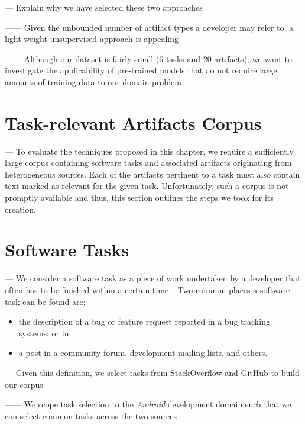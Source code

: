 \clearpage

--- Explain why we have selected these two approaches

------ Given the unbounded number of artifact types a developer may refer to, a light-weight unsupervised approach is appealing

------ Although our dataset is fairly small (6 tasks and 20 artifacts), we want to investigate 
the applicability of pre-trained models that do not require large amounts of training data
to our domain problem~\cite{devlin2018bert, Ye2016, Bavota2016}

\section{Task-relevant Artifacts Corpus}

--- To evaluate the techniques proposed in this chapter, we require a sufficiently large corpus containing 
software tasks and associated artifacts originating from heterogeneous sources.
Each of the artifacts pertinent to a task must also contain text marked as relevant for the given task.
Unfortunately, such a corpus is not promptly available and thus, 
this section outlines the steps we took for its creation.


\section{Software Tasks}

--- We consider a software task as a piece of work undertaken by a developer that often has to be finished within a certain time~\cite{2004merriam}. 
Two common places a software task can be found are:

\begin{itemize}
    \item the description of a bug or feature request reported in a bug tracking systems; or in
    \item a post in a community forum, development mailing lists, and others.
\end{itemize}

\vspace{3mm}

--- Given this definition, we select tasks from StackOverflow and GitHub to build our corpus

------ We scope task selection to the \textit{Android} development domain such that we can select common tasks across the two sources \vspace{3mm}



